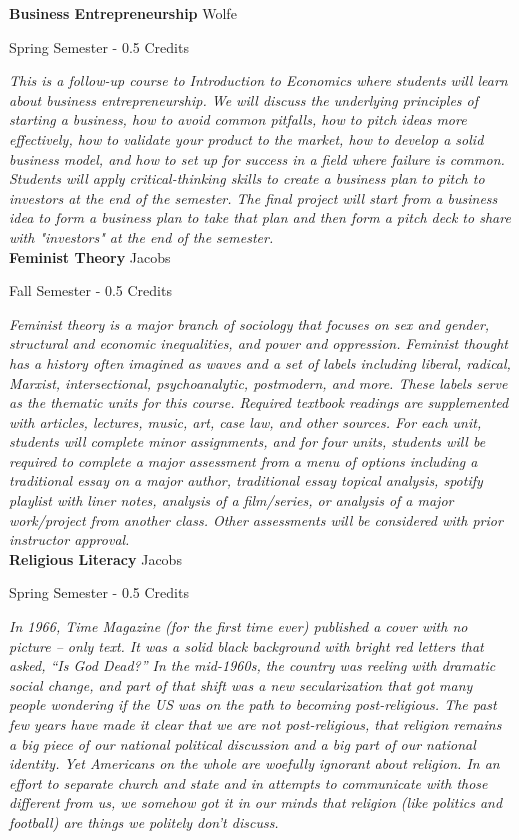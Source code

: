 \noindent\textbf{Business Entrepreneurship} \hfill Wolfe

\noindent Spring Semester - 0.5 Credits

\vspace{1mm}\emph{This is a follow-up course to Introduction to Economics where students will learn about business entrepreneurship. We will discuss the underlying principles of starting a business, how to avoid common pitfalls, how to pitch ideas more effectively, how to validate your product to the market, how to develop a solid business model, and how to set up for success in a field where failure is common. Students will apply critical-thinking skills to create a business plan to pitch to investors at the end of the semester. The final project will start from a business idea to form a business plan to take that plan and then form a pitch deck to share with "investors" at the end of the semester.}\\


\noindent\textbf{Feminist Theory} \hfill Jacobs

\noindent Fall Semester - 0.5 Credits

\vspace{1mm}\emph{Feminist theory is a major branch of sociology that focuses on sex and gender, structural and economic inequalities, and power and oppression.  Feminist thought has a history often imagined as waves and a set of labels including liberal, radical, Marxist, intersectional, psychoanalytic, postmodern, and more.  These labels serve as the thematic units for this course.  Required textbook readings are supplemented with articles, lectures, music, art, case law, and other sources.  For each unit, students will complete minor assignments, and for four units, students will be required to complete a major assessment from a menu of options including a traditional essay on a major author, traditional essay topical analysis, spotify playlist with liner notes, analysis of a film/series, or analysis of a major work/project from another class.  Other assessments will be considered with prior instructor approval.}\\


\noindent\textbf{Religious Literacy} \hfill Jacobs

\noindent Spring Semester - 0.5 Credits

\vspace{1mm}\emph{In 1966, Time Magazine (for the first time ever) published a cover with no picture – only text. It was a solid black background with bright red letters that asked, “Is God Dead?” In the mid-1960s, the country was reeling with dramatic social change, and part of that shift was a new secularization that got many people wondering if the US was on the path to becoming post-religious. The past few years have made it clear that we are not post-religious, that religion remains a big piece of our national political discussion and a big part of our national identity. Yet Americans on the whole are woefully ignorant about religion. In an effort to separate church and state and in attempts to communicate with those different from us, we somehow got it in our minds that religion (like politics and football) are things we politely don’t discuss.}\\